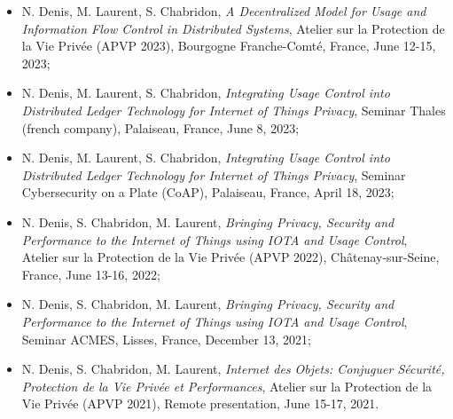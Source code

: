 \begin{itemize}
    \item[] N. Denis, M. Laurent, S. Chabridon,  \emph{A Decentralized Model for Usage and Information Flow Control in Distributed Systems}, Atelier sur la Protection de la Vie Privée (APVP 2023), Bourgogne Franche-Comté, France, June 12-15, 2023;
    \item[] N. Denis, M. Laurent, S. Chabridon, \emph{Integrating Usage Control into Distributed Ledger Technology for Internet of Things Privacy}, Seminar Thales (french company), Palaiseau, France, June 8, 2023;
    \item[] N. Denis, M. Laurent, S. Chabridon, \emph{Integrating Usage Control into Distributed Ledger Technology for Internet of Things Privacy}, Seminar Cybersecurity on a Plate (CoAP), Palaiseau, France, April 18, 2023;
    \item[] N. Denis, S. Chabridon, M. Laurent, \emph{Bringing Privacy, Security and Performance to the Internet of Things using IOTA and Usage Control}, Atelier sur la Protection de la Vie Privée (APVP 2022), Châtenay-sur-Seine, France, June 13-16, 2022;
    \item[] N. Denis, S. Chabridon, M. Laurent, \emph{Bringing Privacy, Security and Performance to the Internet of Things using IOTA and Usage Control}, Seminar ACMES, Lisses, France, December 13, 2021;
    \item[] N. Denis, S. Chabridon, M. Laurent, \emph{Internet des Objets: Conjuguer Sécurité, Protection de la Vie Privée et Performances}, Atelier sur la Protection de la Vie Privée (APVP 2021), Remote presentation, June 15-17, 2021.
\end{itemize}